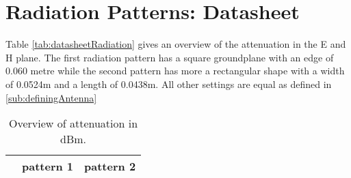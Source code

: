\chapter{Radiation Patterns: Datasheet}
\label{ch:radpattern}
Table \ref{tab:datasheetRadiation} gives an overview of the attenuation in the E and H plane. The first radiation pattern 
 has a square groundplane with an edge of 0.060 metre while the second pattern 
 has more a rectangular shape with a width of 0.0524m and a length of 0.0438m.
All other settings are equal as defined in \ref{sub:definingAntenna}
\begin{table*}[!ht]
\centering
\caption{Overview of attenuation in dBm.}
\begin{tabular}{|c|c|c|c|c|}
\hline
 & \multicolumn{2}{c|}{pattern 1} & \multicolumn{2}{c|}{pattern 2}\\\hline


\end{tabular}
\end{table*}
